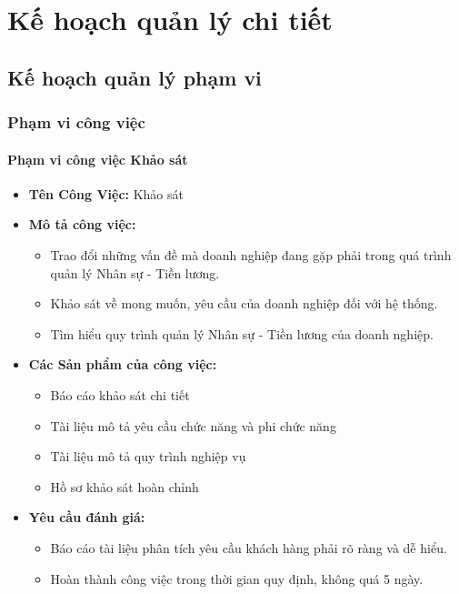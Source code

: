 \chapter{Kế hoạch quản lý chi tiết}
\section{Kế hoạch quản lý phạm vi}
\subsection{Phạm vi công việc}
\subsubsection{Phạm vi công việc Khảo sát}
\begin{itemize}
    \item \textbf{Tên Công Việc:} Khảo sát
    \item \textbf{Mô tả công việc:}
          \begin{itemize}
              \item Trao đổi những vấn đề mà doanh nghiệp đang gặp phải trong quá trình quản lý Nhân sự - Tiền lương.
              \item Khảo sát về mong muốn, yêu cầu của doanh nghiệp đối với hệ thống.
              \item Tìm hiểu quy trình quản lý Nhân sự - Tiền lương của doanh nghiệp.
          \end{itemize}
    \item \textbf{Các Sản phẩm của công việc:}
          \begin{itemize}
              \item Báo cáo khảo sát chi tiết
              \item Tài liệu mô tả yêu cầu chức năng và phi chức năng
              \item Tài liệu mô tả quy trình nghiệp vụ
              \item Hồ sơ khảo sát hoàn chỉnh
          \end{itemize}
    \item \textbf{Yêu cầu đánh giá:}
          \begin{itemize}
              \item Báo cáo tài liệu phân tích yêu cầu khách hàng phải rõ ràng và dễ hiểu.
              \item Hoàn thành công việc trong thời gian quy định, không quá 5 ngày.
          \end{itemize}
\end{itemize}
